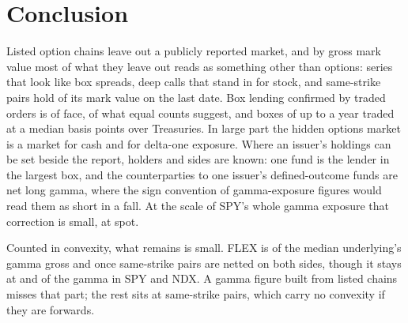 \documentclass[11pt]{article}
\begin{document}
\section{Conclusion}

Listed option chains leave out a publicly reported market, and by gross mark value most
of what they leave out reads as something other than options: series that look like box
spreads, deep calls that stand in for stock, and same-strike pairs hold
\AnatFinancingValueShare{} of its mark value on the last date. Box lending confirmed by
traded orders is \BoxRTradedFace{} of face, \BoxRTradedShare{} of what equal counts
suggest, and boxes of up to a year traded at a median \BoxRSpreadMedian{} basis points
over Treasuries. In large part the hidden options market is a market for cash and for
delta-one exposure. Where an issuer's holdings can be set beside the report, holders and
sides are known: one fund is the lender in the largest box, and the counterparties to one
issuer's defined-outcome funds are net long gamma, where the sign convention of
gamma-exposure figures would read them as short in a fall. At the scale of SPY's whole
gamma exposure that correction is small, \GexSigningSpot{} at spot.

Counted in convexity, what remains is small. FLEX is \GammaMedianGross{} of the median
underlying's gamma gross and \GammaMedianBoth{} once same-strike pairs are netted on both
sides, though it stays at \GammaSPYBoth{} and \GammaNDXBoth{} of the gamma in SPY and NDX.
A gamma figure built from listed chains misses that part; the rest sits at same-strike
pairs, which carry no convexity if they are forwards.
\end{document}
